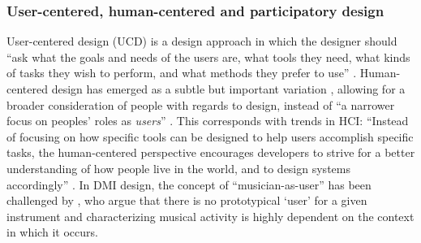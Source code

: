 \documentclass[letterpaper, 12pt]{article}
\begin{document}
\subsubsection{User-centered, human-centered and participatory design}
\label{sec:user-centered-design}

User-centered design (UCD) is a design approach in which the designer should ``ask what the goals and needs of the users are, what tools they need, what kinds of tasks they wish to perform, and what methods they prefer to use'' \citep[\citeauthor{Norman1988} \citeyear{Norman1988}, as cited in][p. 44]{El-shimy2014}. 
Human-centered design has emerged as a subtle but important variation \citep{Norman2013}, allowing for a broader consideration of people with regards to design, instead of ``a narrower focus on peoples' roles as \emph{users}'' \citep[p. 45]{Steen2011}. This corresponds with trends in HCI: ``Instead of focusing on how specific tools can be designed to help users accomplish specific tasks, the human-centered perspective encourages developers to strive for a better understanding of how people live in the world, and to design systems accordingly'' \citep[p. 45]{El-shimy2014}. In DMI design, the concept of ``musician-as-user'' has been challenged by \citet{Rodger2020}, who argue 
that there is no prototypical `user' for a given instrument and characterizing musical activity is highly dependent on the context in which it occurs.
\end{document}
